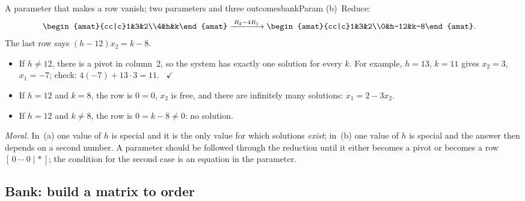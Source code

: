 \documentclass[11pt]{article}
\begin{document}
\begin{exmp}{A parameter that makes a row vanish; two parameters and three outcomes}{bankParam}
(b)~Reduce:
\begin{align*}
&\begin{amat}{cc|c}1&3&2\\4&h&k\end{amat}
\rops{R_2-4R_1}
\begin{amat}{cc|c}1&3&2\\0&h-12&k-8\end{amat}.
\end{align*}
The last row says $(h-12)x_2=k-8$.
\begin{itemize}
  \item If $h\neq12$, there is a pivot in column~2, so the system has exactly one solution for every $k$. For example, $h=13$, $k=11$ gives $x_2=3$, $x_1=-7$; check: $4(-7)+13\cdot3=11$. \ $\checkmark$
  \item If $h=12$ and $k=8$, the row is $0=0$, $x_2$ is free, and there are infinitely many solutions: $x_1=2-3x_2$.
  \item If $h=12$ and $k\neq8$, the row is $0=k-8\neq0$: no solution.
\end{itemize}

\emph{Moral.} In~(a) one value of $h$ is special and it is the only value for which solutions \emph{exist}; in~(b) one value of $h$ is special and the answer then depends on a second number. A parameter should be followed through the reduction until it either becomes a pivot or becomes a row $[\,0\ \cdots\ 0\mid\ast\,]$; the condition for the second case is an equation in the parameter.
\end{exmp}

\subsection*{Bank: build a matrix to order}
\end{document}

